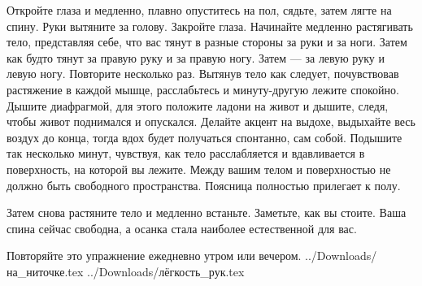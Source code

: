 Откройте глаза и медленно, плавно опуститесь на пол, сядьте, затем лягте на спину. Руки вытяните за голову. Закройте глаза. Начинайте медленно растягивать тело, представляя себе, что вас тянут в разные стороны за руки и за ноги. Затем как будто тянут за правую руку и за правую ногу. Затем --- за левую руку и левую ногу. Повторите несколько раз. Вытянув тело как следует, почувствовав растяжение в каждой мышце, расслабьтесь и минуту-другую лежите спокойно. Дышите диафрагмой, для этого положите ладони на живот и дышите, следя, чтобы живот поднимался и опускался. Делайте акцент на выдохе, выдыхайте весь воздух до конца, тогда вдох будет получаться спонтанно, сам собой. Подышите так несколько минут, чувствуя, как тело расслабляется
и вдавливается в поверхность, на которой вы лежите.
Между вашим телом и поверхностью не должно быть свободного пространства. Поясница полностью прилегает к полу.

Затем снова растяните тело и медленно встаньте. Заметьте, как вы стоите. Ваша спина сейчас свободна, а осанка стала наиболее естественной для вас.

Повторяйте это упражнение ежедневно утром или вечером.
\bye
../Downloads/на_ниточке.tex
../Downloads/лёгкость_рук.tex
